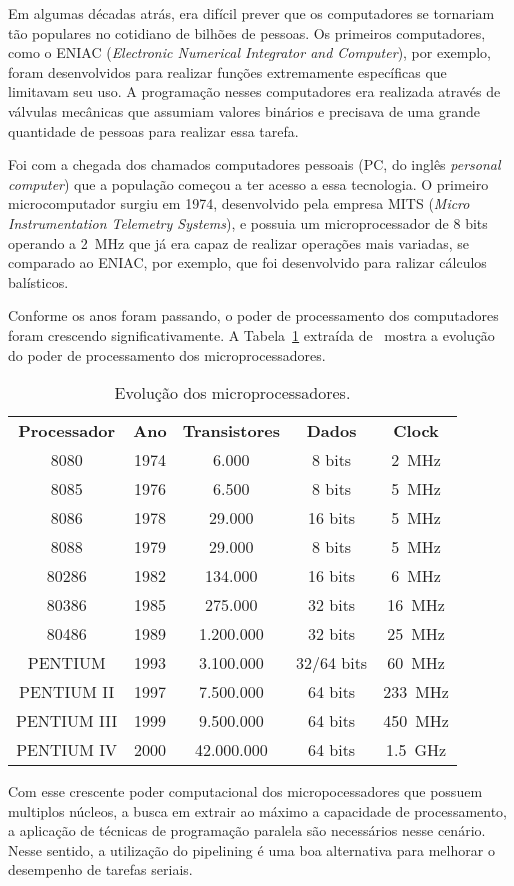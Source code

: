 Em algumas décadas atrás, era difícil prever que os computadores se tornariam
tão populares no cotidiano de bilhões de pessoas. Os primeiros computadores,
como o ENIAC (\textit{Electronic Numerical Integrator and Computer}), por
exemplo, foram desenvolvidos para realizar funções extremamente específicas que
limitavam seu uso. A programação nesses computadores era realizada através de
válvulas mecânicas que assumiam valores binários e precisava de uma grande
quantidade de pessoas para realizar essa tarefa.

Foi com a chegada dos chamados computadores pessoais (PC, do inglês
\textit{personal computer}) que a população começou a ter acesso a essa
tecnologia. O primeiro microcomputador surgiu em 1974, desenvolvido pela empresa
MITS (\textit{Micro Instrumentation Telemetry Systems}), e possuia um
microprocessador de 8 bits operando a 2~MHz que já era capaz de realizar
operações mais variadas, se comparado ao ENIAC, por exemplo, que foi
desenvolvido para ralizar cálculos balísticos.

Conforme os anos foram passando, o poder de processamento dos computadores foram
crescendo significativamente. A Tabela~\ref{tab:cpu} extraída
de~\cite{Evolutio17} mostra a evolução do poder de processamento dos
microprocessadores.

\begin{table}[h!]
\centering
\caption{Evolução dos microprocessadores.}
\label{tab:cpu}
\begin{tabular}{ccccc} %
\hline
\textbf{Processador} & \textbf{Ano} & \textbf{Transistores} & \textbf{Dados} & \textbf{Clock}\\
8080 & 1974 & 6.000 & 8 bits & 2~MHz \\
8085 & 1976 & 6.500 & 8 bits & 5~MHz \\
8086 & 1978 & 29.000 & 16 bits & 5~MHz \\
8088 & 1979 & 29.000 & 8 bits & 5~MHz \\
80286 & 1982 & 134.000 & 16 bits & 6~MHz \\
80386 & 1985 & 275.000 & 32 bits & 16~MHz \\ 
80486 & 1989 & 1.200.000 & 32 bits & 25~MHz \\
PENTIUM & 1993 & 3.100.000 & 32/64 bits & 60~MHz \\ 
PENTIUM II & 1997 & 7.500.000 & 64 bits & 233~MHz \\
PENTIUM III & 1999 & 9.500.000 & 64 bits & 450~MHz \\
PENTIUM IV & 2000 & 42.000.000 & 64 bits & 1.5~GHz \\
\hline
\end{tabular}
\end{table}

Com esse crescente poder computacional dos micropocessadores que possuem
multiplos núcleos, a busca em extrair ao máximo a capacidade de processamento, a
aplicação de técnicas de programação paralela são necessários nesse cenário.
Nesse sentido, a utilização do pipelining é uma boa alternativa para melhorar o
desempenho de tarefas seriais.


